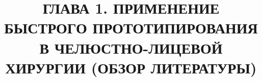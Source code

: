 
\title{
ГЛАВА 1. ПРИМЕНЕНИЕ БЫСТРОГО ПРОТОТИПИРОВАНИЯ В
ЧЕЛЮСТНО-ЛИЦЕВОЙ ХИРУРГИИ (ОБЗОР ЛИТЕРАТУРЫ)
}
